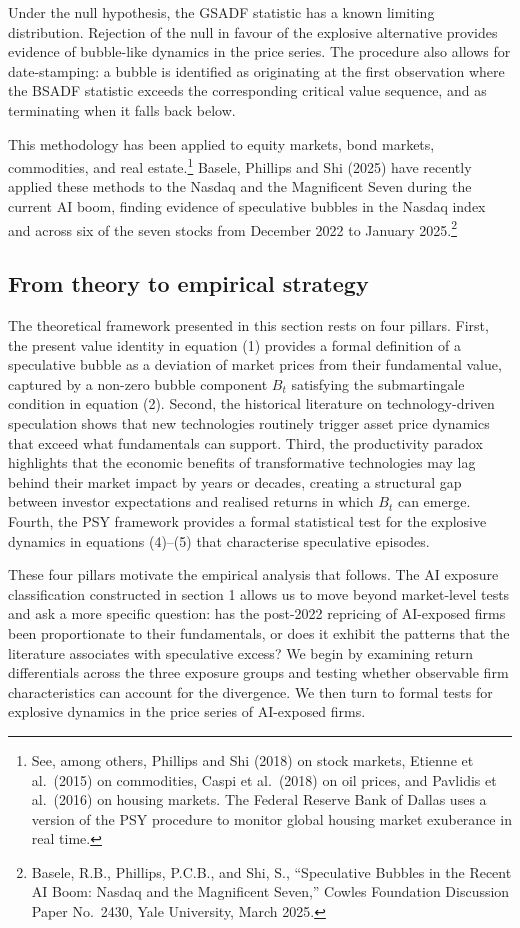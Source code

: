 \documentclass[12pt,a4paper]{article}
\begin{document}
\noindent Under the null hypothesis, the GSADF statistic has a known limiting distribution. Rejection of the null in favour of the explosive alternative provides evidence of bubble-like dynamics in the price series. The procedure also allows for date-stamping: a bubble is identified as originating at the first observation where the BSADF statistic exceeds the corresponding critical value sequence, and as terminating when it falls back below.

This methodology has been applied to equity markets, bond markets, commodities, and real estate.\footnote{See, among others, Phillips and Shi (2018) on stock markets, Etienne et al.\ (2015) on commodities, Caspi et al.\ (2018) on oil prices, and Pavlidis et al.\ (2016) on housing markets. The Federal Reserve Bank of Dallas uses a version of the PSY procedure to monitor global housing market exuberance in real time.} Basele, Phillips and Shi (2025) have recently applied these methods to the Nasdaq and the Magnificent Seven during the current AI boom, finding evidence of speculative bubbles in the Nasdaq index and across six of the seven stocks from December 2022 to January 2025.\footnote{Basele, R.B., Phillips, P.C.B., and Shi, S., ``Speculative Bubbles in the Recent AI Boom: Nasdaq and the Magnificent Seven,'' Cowles Foundation Discussion Paper No.\ 2430, Yale University, March 2025.}

\subsection{From theory to empirical strategy}

The theoretical framework presented in this section rests on four pillars. First, the present value identity in equation (1) provides a formal definition of a speculative bubble as a deviation of market prices from their fundamental value, captured by a non-zero bubble component $B_t$ satisfying the submartingale condition in equation (2). Second, the historical literature on technology-driven speculation shows that new technologies routinely trigger asset price dynamics that exceed what fundamentals can support. Third, the productivity paradox highlights that the economic benefits of transformative technologies may lag behind their market impact by years or decades, creating a structural gap between investor expectations and realised returns in which $B_t$ can emerge. Fourth, the PSY framework provides a formal statistical test for the explosive dynamics in equations (4)--(5) that characterise speculative episodes.

These four pillars motivate the empirical analysis that follows. The AI exposure classification constructed in section 1 allows us to move beyond market-level tests and ask a more specific question: has the post-2022 repricing of AI-exposed firms been proportionate to their fundamentals, or does it exhibit the patterns that the literature associates with speculative excess? We begin by examining return differentials across the three exposure groups and testing whether observable firm characteristics can account for the divergence. We then turn to formal tests for explosive dynamics in the price series of AI-exposed firms.
\end{document}
